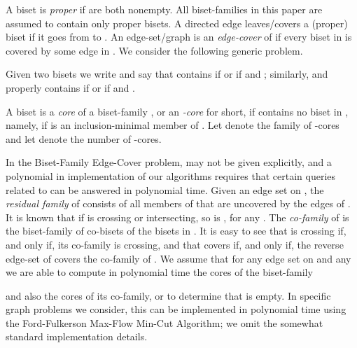 A biset  is {\em proper} if  are both nonempty.
All biset-families in this paper are assumed to contain only proper bisets.
A directed edge  leaves/covers a (proper) biset  if it goes from  to .
An edge-set/graph  is an {\em edge-cover} of  
if every biset in  is covered by some edge in .
We consider the following generic problem.

\vspace{0.1cm}

\begin{center} 
\end{center}

\vspace{0.1cm}

Given two bisets  we write  and 
say that  contains  if 
or if  and ; similarly,  and  
properly contains  if  or if  and .

\begin{definition}
A biset  is a {\em core} of a biset-family ,
or an {\em -core} for short, 
if  contains no biset in , namely,
if  is an inclusion-minimal member of .
Let  denote the family of -cores and let 
 denote the number of -cores.
\end{definition}

In the {\sf Biset-Family Edge-Cover} problem,  may not be given explicitly,
and a polynomial in  implementation of our algorithms requires that certain queries related 
to  can be answered in polynomial time.
Given an edge set  on , the {\em residual family} 
of  consists of all members of  that are uncovered by the edges of .
It is known that if  is crossing or intersecting, so is , for any .
The {\em co-family} of  is the biset-family 
 of co-bisets of the bisets in .
It is easy to see that  is crossing if, and only if, its co-family is crossing,
and that  covers  if, and only if, the reverse edge-set of  covers the co-family 
of . We assume that for any edge set  on  and any  we are able to compute 
in polynomial time the cores of the biset-family 
 
and also the cores of its co-family, or to determine that  is empty.
In specific graph problems we consider, this can be implemented in polynomial time using the 
Ford-Fulkerson Max-Flow Min-Cut Algorithm; we omit the somewhat standard implementation details.

